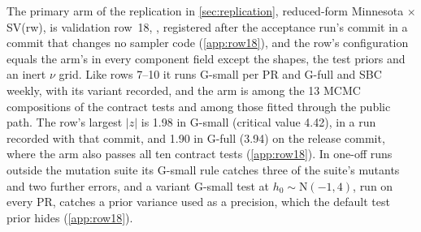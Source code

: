 The primary arm of the replication in \cref{sec:replication}, reduced-form Minnesota $\times$
SV(rw), is validation row~18, , registered after the acceptance run's commit in
a commit that changes no sampler code (\cref{app:row18}), %
and the row's configuration equals the arm's in every component field except the shapes, the test
priors and an inert $\nu$ grid. %
Like rows 7--10 it runs G-small per PR and G-full and SBC weekly, with its 
variant recorded, and the arm is among the 13 MCMC compositions of the contract tests and among
those fitted through the public  path. %
The row's largest $|z|$ is 1.98 in G-small (critical value 4.42), in a run recorded with that
commit, and 1.90 in G-full (3.94) on the release commit, where the arm also passes all ten
contract tests (\cref{app:row18}). %
In one-off runs outside the mutation suite its G-small rule catches three of the suite's mutants
and two further errors, and a variant G-small test at $h_0 \sim \mathrm{N}(-1, 4)$, run on every PR,
catches a prior variance used as a precision, which the default test prior hides
(\cref{app:row18}). %
